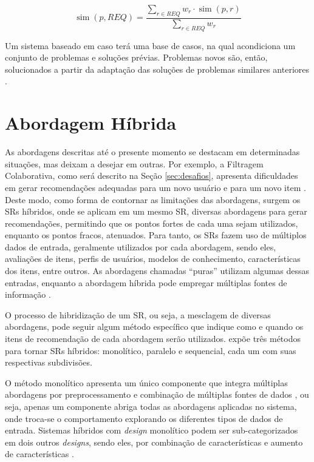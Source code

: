     \begin{equation}
        \operatorname{sim}(p, REQ) = \frac{\sum_{r \in REQ}w_r \cdot \operatorname{sim}(p,r)}{\sum_{r \in REQ}w_r} \label{eq:case-based}
    \end{equation}
    
    Um sistema baseado em caso terá uma base de casos, na qual acondiciona um conjunto de problemas e soluções prévias. Problemas novos são, então, solucionados a partir da adaptação das soluções de problemas similares anteriores \cite{Bridge2005}. 
            
\section{Abordagem H\'ibrida}

    As abordagens descritas até o presente momento se destacam em determinadas situações, mas deixam a desejar em outras. Por exemplo, a Filtragem Colaborativa, como será descrito na Seção \ref{sec:desafios}, apresenta dificuldades em gerar recomendações adequadas para um novo usuário e para um novo item \cite{Ricci2010}. Deste modo, como forma de contornar as limitações das abordagens, surgem os SRs híbridos, onde se aplicam em um mesmo SR, diversas abordagens para gerar recomendações, permitindo que os pontos fortes de cada uma sejam utilizados, enquanto os pontos fracos, atenuados. Para tanto, os SRs fazem uso de múltiplos dados de entrada, geralmente utilizados por cada abordagem, sendo eles, avaliações de itens, perfis de usuários, modelos de conhecimento, características dos itens, entre outros. As abordagens chamadas ``puras'' utilizam algumas dessas entradas, enquanto a abordagem híbrida pode empregar múltiplas fontes de informação \cite{Jannach2010}.
    
    O processo de hibridização de um SR, ou seja, a mesclagem de diversas abordagens, pode seguir algum método específico que indique como e quando os itens de recomendação de cada abordagem serão utilizados.  expõe três métodos para tornar SRs híbridos: monolítico, paralelo e sequencial, cada um com suas respectivas subdivisões.
    
    O método monolítico apresenta um único componente que integra múltiplas abordagens por preprocessamento e combinação de múltiplas fontes de dados \cite{Aggarwal2016}, ou seja, apenas um componente abriga todas as abordagens aplicadas no sistema, onde troca-se o comportamento explorando os diferentes tipos de dados de entrada. Sistemas híbridos com \textit{design} monolítico podem ser sub-categorizados em dois outros \textit{designs}, sendo eles, por combinação de características e aumento de características \cite{Jannach2010}.
    
